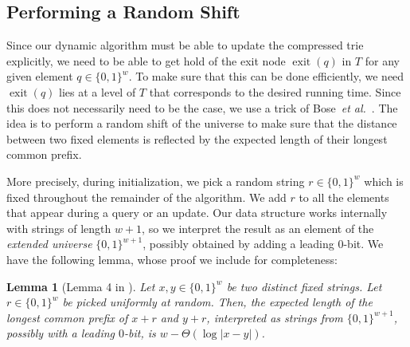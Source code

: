 \documentclass[a4paper,11pt]{article}
\newtheorem{lemma}[theorem]{Lemma}
\newcommand{\etal}{\emph{et al.}\xspace}
\newcommand{\?}{\mskip1.5mu}
\DeclareMathOperator{\exit}{exit}
\begin{document}
\subsection{Performing a Random Shift}

Since our dynamic algorithm must be able to update the
compressed trie explicitly, we need to be able to get hold
of the exit node $\exit(q)$ in $T$ for any given element 
$q \in \{0, 1\}^w$. To make sure that this can be done efficiently,
we need $\exit(q)$ lies at a level of $T$ that corresponds to
the desired running time. Since this
does not necessarily need to be the case, we use a trick of 
Bose~\etal~\cite{BoseDoDuHoMo13}.
The idea is to perform a random shift of the universe to
make sure that the distance between two fixed elements
is reflected by the expected length of their longest common prefix. 

More precisely, during initialization, we pick a random 
string $r \in \{0, 1\}^w$ which is fixed throughout 
the remainder of the algorithm. We
add $r$ to all the elements that appear during a
query or an update. Our data structure works internally
with strings of length $w + 1$, so we interpret
the result as an element of the
\emph{extended universe} $\{0, 1\}^{w + 1}$, possibly
obtained by adding a leading $0$-bit.
We have
the following lemma, whose proof we include for completeness:

\begin{lemma}[Lemma 4 in \cite{BoseDoDuHoMo13}]
\label{lemma:delta_lca_loglog_delta}
Let $x, y \in \{0, 1\}^w$ be two distinct fixed strings.
Let $r \in \{0, 1\}^w$ be picked uniformly at random.
Then, the expected length of the longest common
prefix of $x + r$ and $y + r$, interpreted
as strings from $\{0, 1\}^{w+1}$, possibly with 
a leading $0$-bit,
is $w - \Theta(\log|x - y|)$.
\end{lemma}
\end{document}
